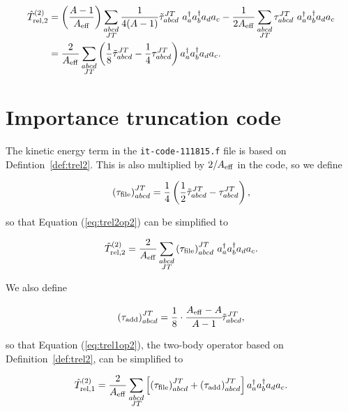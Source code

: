 \documentclass{article}
\def\aeff{A_{\rm{eff}}}
\def\trelopi_#1^#2{\hat{T}_{\rm{rel}, #1}^{#2}}
\def\creop{a^{\dagger}}
\def\annop{a}
\begin{document}
\begin{equation}\label{eq:trel2op2}
  \begin{aligned}
    \trelopi_2^{(2)} &= \left(\frac{A-1}{\aeff}\right)
    \displaystyle\sum_{\substack{abcd\\JT}} \frac{1}{4(A-1)}
    \tilde{\tau}_{abcd}^{JT}~\creop_a\creop_b\annop_d\annop_c
    -\frac{1}{2\aeff} \displaystyle\sum_{\substack{abcd\\JT}}
    \tau_{abcd}^{JT}~\creop_a\creop_b\annop_d\annop_c\\
    &= \frac{2}{\aeff} \displaystyle\sum_{\substack{abcd\\JT}}
    \left( \frac{1}{8}\tilde{\tau}_{abcd}^{JT}
    -\frac{1}{4}\tau_{abcd}^{JT} \right)\creop_a\creop_b\annop_d\annop_c.
  \end{aligned}
\end{equation}

\section{Importance truncation code}

The kinetic energy term in the \texttt{it-code-111815.f} file is based
on Defintion~\ref{def:trel2}. This is also multiplied by $2/A_{\rm{eff}}$ in
the code, so we define

\begin{equation}
  {(\tau_{\rm{file}})}_{abcd}^{JT} = \frac{1}{4}
  \left( \frac{1}{2} \tilde{\tau}_{abcd}^{JT} - \tau_{abcd}^{JT} \right),
\end{equation}

so that Equation (\ref{eq:trel2op2}) can be simplified to

\begin{equation}
  \trelopi_2^{(2)} = \frac{2}{\aeff}
  \displaystyle\sum_{\substack{abcd\\JT}} {(\tau_{\rm{file}})}_{abcd}^{JT}
  ~\creop_a\creop_b\annop_d\annop_c.
\end{equation}

We also define

\begin{equation}
  {(\tau_{\rm{add}})}_{abcd}^{JT} = \frac{1}{8}\cdot
  \cfrac{\aeff-A}{A-1} \tilde{\tau}_{abcd}^{JT},
\end{equation}

so that Equation (\ref{eq:trel1op2}), the two-body operator based on
Definition~\ref{def:trel2}, can be simplified to

\begin{equation}
  \trelopi_1^{(2)} = \frac{2}{\aeff}
  \displaystyle\sum_{\substack{abcd\\JT}} \left[ 
  {(\tau_{\rm{file}})}_{abcd}^{JT} + {(\tau_{\rm{add}})}_{abcd}^{JT}
  \right]\creop_a\creop_b\annop_d\annop_c.
\end{equation}
\end{document}

